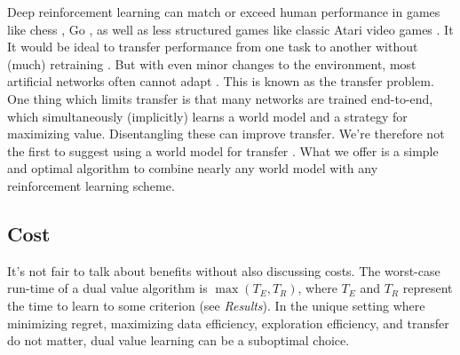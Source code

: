 Deep reinforcement learning can match or exceed human performance in games like chess \cite{Silver2018}, Go \cite{Silver2016b}, as well as less structured games like classic Atari video games \cite{Mnih2015}. It It would be ideal to transfer performance from one task to another without (much) retraining \cite{Sutton2018}. But with even minor changes to the environment, most artificial networks often cannot adapt \cite{Zhang2018,Zhang2018a}. This is known as the transfer problem. One thing which limits transfer is that many networks are trained end-to-end, which simultaneously (implicitly) learns a world model and a strategy for maximizing value. Disentangling these can improve transfer. We're therefore not the first to suggest using a world model for transfer \cite{Barreto2018,Ha2018}. What we offer is a simple and optimal algorithm to combine nearly any world model with any reinforcement learning scheme.

\subsection*{Cost}
It's not fair to talk about benefits without also discussing costs. The worst-case run-time of a dual value algorithm is $\max(T_E, T_R)$, where $T_E$ and $T_R$ represent the time to learn to some criterion (see \textit{Results}). In the unique setting where minimizing regret, maximizing data efficiency, exploration efficiency, and transfer do not matter, dual value learning can be a suboptimal choice. 
